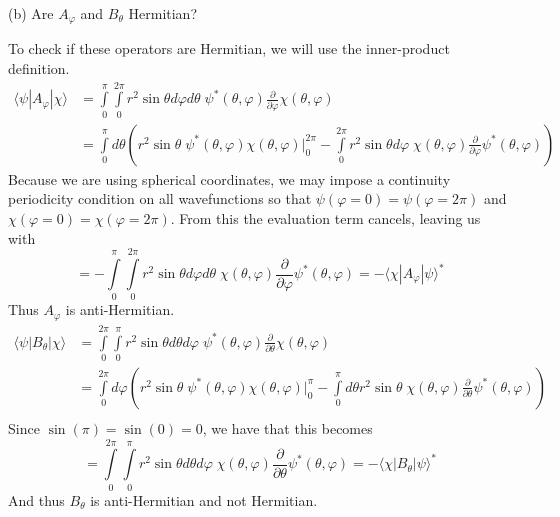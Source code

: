 \documentclass[a4paper, 11pt]{article}
\newcommand{\ket}[1]{|#1\rangle}
\newcommand{\bra}[1]{\langle #1 |}
\newenvironment{solution}{%
	\begin{list}{}{%
			\setlength{\topsep}{0pt}%
			\setlength{\leftmargin}{1.5cm}%
			\setlength{\rightmargin}{1.5cm}%
			\setlength{\listparindent}{\parindent}%
			\setlength{\itemindent}{\parindent}%
			\setlength{\parsep}{\parskip}%
		}%
		\item[]}{\end{list}}
\begin{document}
\noindent (b) Are $A_\varphi$ and $B_\theta$ Hermitian? 
	\begin{solution}
		\noindent To check if these operators are Hermitian, we will use the inner-product definition. 
		\begin{align*}
			\bra{\psi}A_\varphi\ket{\chi} &= \int\limits_0^\pi \int\limits_0^{2\pi}r^2\sin\theta d\varphi d\theta\; \psi^*(\theta, \varphi)\frac{\partial}{\partial \varphi}\chi(\theta, \varphi) \\
			&= \int\limits_0^\pi d\theta \left( r^2\sin\theta\; \psi^*(\theta, \varphi)\chi(\theta,\varphi) \Big|_{0}^{2\pi}-\int\limits_0^{2\pi}r^2\sin\theta d\varphi \; \chi(\theta,\varphi)\frac{\partial}{\partial \varphi}\psi^*(\theta, \varphi)  \right)
		\end{align*}
		Because we are using spherical coordinates, we may impose a continuity periodicity condition on all wavefunctions so that $\psi(\varphi=0)=\psi(\varphi=2\pi)$ and $\chi(\varphi=0)=\chi(\varphi=2\pi)$. From this the evaluation term cancels, leaving us with
			\begin{equation*}
				= -\int\limits_0^\pi\int\limits_0^{2\pi} r^2\sin\theta d\varphi d\theta\; \chi(\theta,\varphi)\frac{\partial}{\partial\varphi}\psi^*(\theta,\varphi) = -\bra{\chi}A_\varphi\ket{\psi}^*
			\end{equation*}
		Thus $A_\varphi$ is anti-Hermitian. 
			\begin{align*}
				\bra{\psi}B_\theta\ket{\chi} &= \int\limits_0^{2\pi}\int\limits_{0}^{\pi}r^2\sin\theta d\theta d\varphi \; \psi^*(\theta, \varphi)\frac{\partial}{\partial \theta}\chi(\theta, \varphi) \\
					&= \int\limits_{0}^{2\pi}d\varphi \left( r^2\sin\theta\;\psi^*(\theta,\varphi)\chi(\theta,\varphi)\Big|_{0}^{\pi}-\int\limits_{0}^{\pi}d\theta r^2\sin\theta \; \chi(\theta,\varphi)\frac{\partial}{\partial \theta} \psi^*(\theta, \varphi)\right) \\ 
			\end{align*}
		Since $\sin(\pi)=\sin(0)=0$, we have that this becomes
			\begin{equation*}
				= \int\limits_0^{2\pi}\int\limits_0^{\pi}r^2\sin\theta d\theta d\varphi \; \chi(\theta,\varphi)\frac{\partial}{\partial \theta}\psi^*(\theta,\varphi) = -\bra{\chi}B_\theta\ket{\psi}^* 
			\end{equation*}
		And thus $B_\theta$ is anti-Hermitian and not Hermitian. \\
	\end{solution}
\end{document}
